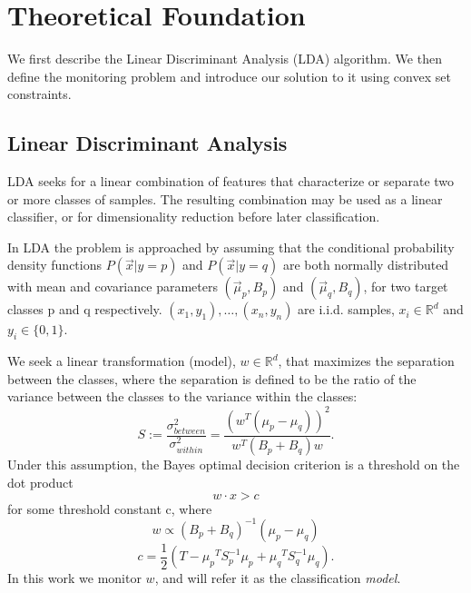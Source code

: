 \documentclass{sig-alternate-05-2015}
\begin{document}
\section{Theoretical Foundation}
We first describe the Linear Discriminant Analysis (LDA) algorithm.
We then define the monitoring problem and introduce our solution to it
using convex set constraints.

\subsection{Linear Discriminant Analysis}%
LDA seeks for a linear combination of features that characterize or separate two or more classes of samples.
The resulting combination may be used as a linear classifier, or for dimensionality reduction before later classification.

In LDA the problem is approached by assuming that the conditional probability
density functions $P(\vec x|y=p)$ and $P(\vec x|y=q)$ are both normally distributed with
mean and covariance parameters $\left(\vec \mu_p, B_p\right)$ and
$\left(\vec \mu_q, B_q\right)$, for two target classes p and q respectively.
${(x_1,y_1),\ldots,(x_n,y_n)}$ are i.i.d. samples, $x_i \in \mathbb{R}^d$
and $y_i \in \{0,1\}$.

We seek a linear transformation (model), $w \in \mathbb{R}^d $,
that maximizes the separation between the classes, where the separation is
defined to be the ratio of the variance between the classes to the variance
within the classes:
\begin{equation*}
S := \frac{\sigma^2_{between}}{\sigma^2_{within}} = \frac{(w^T (\mu_p -
\mu_q))^2}{w^T(B_p+B_q)w}.
\end{equation*}
Under this assumption, the Bayes optimal decision criterion is a threshold on the
dot product
\begin{equation*} \label{eq:decision}
w \cdot x > c
\end{equation*}
for some threshold constant c, where
\begin{equation} \label{eq:w}
w \propto (B_p+B_q)^{-1}(\mu_p - \mu_q)
\end{equation}
\begin{equation} \label{eq:c}
c = \frac{1}{2}(T-{\mu_p}^T S_p^{-1} {\mu_p}+{\mu_q}^T S_q^{-1} {\mu_q}).
\end{equation}
In this work we monitor $w$, and will refer it as the
classification \textit{model}.
\end{document}
